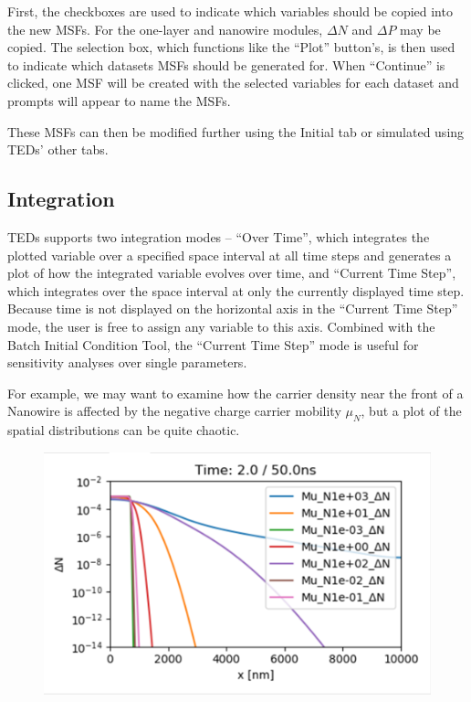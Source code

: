 \documentclass[11pt,letterpaper,titlepage]{article}
\begin{document}
		\par First, the checkboxes are used to indicate which variables should be copied into the new MSFs. For the one-layer and nanowire modules, $\Delta N$ and $\Delta P$ may be copied. The selection box, which functions like the “Plot” button’s, is then used to indicate which datasets MSFs should be generated for. When “Continue” is clicked, one MSF will be created with the selected variables for each dataset and prompts will appear to name the MSFs.
		
		\par These MSFs can then be modified further using the Initial tab or simulated using TEDs’ other tabs.
		
		\subsection {Integration}
		
		\par TEDs supports two integration modes – “Over Time”, which integrates the plotted variable over a specified space interval at all time steps and generates a plot of how the integrated variable evolves over time, and “Current Time Step”, which integrates over the space interval at only the currently displayed time step. Because time is not displayed on the horizontal axis in the “Current Time Step” mode, the user is free to assign any variable to this axis. Combined with the Batch Initial Condition Tool, the “Current Time Step” mode is useful for sensitivity analyses over single parameters.
		
		\par For example, we may want to examine how the carrier density near the front of a Nanowire is affected by the negative charge carrier mobility $\mu_N$, but a plot of the spatial distributions can be quite chaotic.
		\begin{figure}[H]
			\label{fig:mubatch_example}
			\centering
			\includegraphics{"mun"}
		\end{figure}
	
\end{document}
